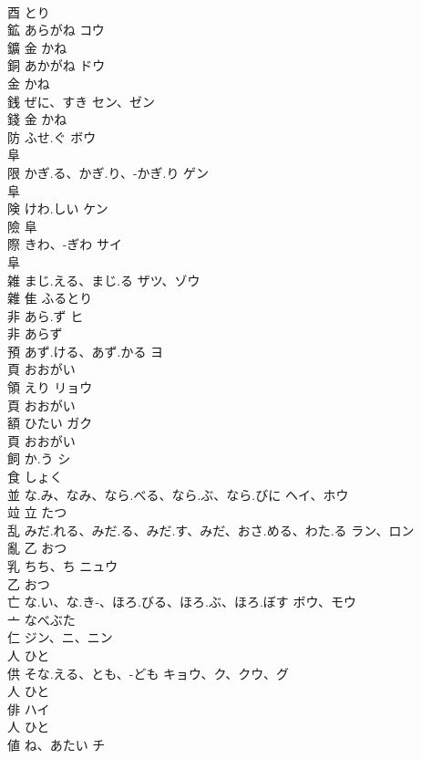 \documentclass[8pt]{extreport}
\begin{document}
\begin{CJK}{UTF8}{min}
\\	酉		とり		
\\	鉱	あらがね	コウ	
\\	鑛	金		かね		
\\	銅	あかがね	ドウ	
\\	金		かね		
\\	銭	ぜに、すき	セン、ゼン	
\\	錢	金		かね		
\\	防	ふせ.ぐ	ボウ	
\\	阜				
\\	限	かぎ.る、かぎ.り、-かぎ.り	ゲン	
\\	阜				
\\	険	けわ.しい	ケン	
\\	險	阜				
\\	際	きわ、-ぎわ	サイ	
\\	阜				
\\	雑	まじ.える、まじ.る	ザツ、ゾウ	
\\	雜	隹		ふるとり		
\\	非	あら.ず	ヒ	
\\	非		あらず		
\\	預	あず.ける、あず.かる	ヨ	
\\	頁		おおがい		
\\	領	えり	リョウ	
\\	頁		おおがい		
\\	額	ひたい	ガク	
\\	頁		おおがい		
\\	飼	か.う	シ	
\\	食		しょく		
\\	並	な.み、なみ、なら.べる、なら.ぶ、なら.びに	ヘイ、ホウ	
\\	竝	立		たつ		
\\	乱	みだ.れる、みだ.る、みだ.す、みだ、おさ.める、わた.る	ラン、ロン	
\\	亂	乙		おつ		
\\	乳	ちち、ち	ニュウ	
\\	乙		おつ		
\\	亡	な.い、な.き-、ほろ.びる、ほろ.ぶ、ほろ.ぼす	ボウ、モウ	
\\	亠		なべぶた		
\\	仁		ジン、ニ、ニン	
\\	人		ひと		
\\	供	そな.える、とも、-ども	キョウ、ク、クウ、グ	
\\	人		ひと		
\\	俳		ハイ	
\\	人		ひと		
\\	値	ね、あたい	チ	

\end{CJK}
\end{document}
